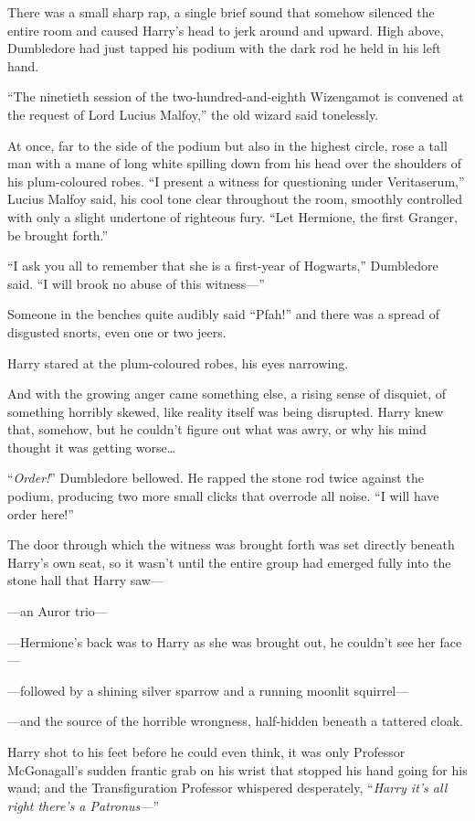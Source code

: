 There was a small sharp rap, a single brief sound that somehow silenced the entire room and caused Harry’s head to jerk around and upward. High above, Dumbledore had just tapped his podium with the dark rod he held in his left hand.

“The ninetieth session of the two-hundred-and-eighth Wizengamot is convened at the request of Lord Lucius Malfoy,” the old wizard said tonelessly.

At once, far to the side of the podium but also in the highest circle, rose a tall man with a mane of long white spilling down from his head over the shoulders of his plum-coloured robes. “I present a witness for questioning under Veritaserum,” Lucius Malfoy said, his cool tone clear throughout the room, smoothly controlled with only a slight undertone of righteous fury. “Let Hermione, the first Granger, be brought forth.”

“I ask you all to remember that she is a first-year of Hogwarts,” Dumbledore said. “I will brook no abuse of this witness—”

Someone in the benches quite audibly said “Pfah!” and there was a spread of disgusted snorts, even one or two jeers.

Harry stared at the plum-coloured robes, his eyes narrowing.

And with the growing anger came something else, a rising sense of disquiet, of something horribly skewed, like reality itself was being disrupted. Harry knew that, somehow, but he couldn’t figure out what was awry, or why his mind thought it was getting worse…

“\emph{Order!}” Dumbledore bellowed. He rapped the stone rod twice against the podium, producing two more small clicks that overrode all noise. “I will have order here!”

The door through which the witness was brought forth was set directly beneath Harry’s own seat, so it wasn’t until the entire group had emerged fully into the stone hall that Harry saw—

—an Auror trio—

—Hermione’s back was to Harry as she was brought out, he couldn’t see her face—

—followed by a shining silver sparrow and a running moonlit squirrel—

—and the source of the horrible wrongness, half-hidden beneath a tattered cloak.

Harry shot to his feet before he could even think, it was only Professor McGonagall’s sudden frantic grab on his wrist that stopped his hand going for his wand; and the Transfiguration Professor whispered desperately, “\emph{Harry it’s all right there’s a Patronus—}”

